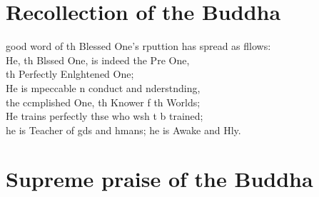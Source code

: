 
\chapter{Recollection of the Buddha}%

\begin{leader}
\end{leader}

 good word of th Blessed One's rputtion has spread as fllows:\\
He, th Blssed One, is indeed the Pre One,\\
\vin th Perfectly Enlghtened One;\\
He is mpeccable n conduct and nderstnding,\\
\vin the ccmplished One, th Knower f th Worlds;\\
He trains perfectly thse who wsh t b trained;\\
\vin he is Teacher of gds and hmans; he is Awake and Hly.

\clearpage

\chapter{Supreme praise of the Buddha}%

\begin{leader}
\end{leader}

